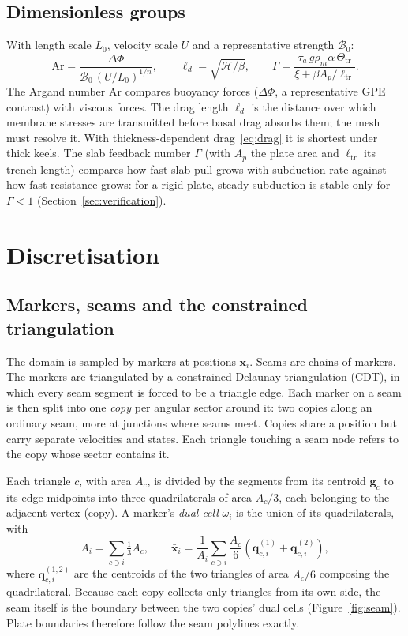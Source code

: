 \documentclass[11pt]{article}
\newcommand{\vect}[1]{\mathbf{#1}}
\newcommand{\Hint}{\mathcal{H}}
\newcommand{\Bint}{\mathcal{B}}
\begin{document}
\subsection{Dimensionless groups}
With length scale $L_0$, velocity scale $U$ and a representative strength $\Bint_0$:
\begin{equation}
  \mathrm{Ar} = \frac{\Delta\Phi}{\Bint_0\,(U/L_0)^{1/n}},
  \qquad
  \ell_d = \sqrt{\Hint/\beta},
  \qquad
  \Gamma = \frac{\tau_a\,g\rho_m\alpha\,\Theta_{\mathrm{tr}}}{\xi + \beta A_p/\ell_{\mathrm{tr}}}.
\end{equation}
The Argand number $\mathrm{Ar}$ compares buoyancy forces ($\Delta\Phi$, a representative GPE contrast) with viscous forces. The drag length $\ell_d$ is the distance over which membrane stresses are transmitted before basal drag absorbs them; the mesh must resolve it. With thickness-dependent drag~\eqref{eq:drag} it is shortest under thick keels. The slab feedback number $\Gamma$ (with $A_p$ the plate area and $\ell_{\mathrm{tr}}$ its trench length) compares how fast slab pull grows with subduction rate against how fast resistance grows: for a rigid plate, steady subduction is stable only for $\Gamma<1$ (Section~\ref{sec:verification}).

\section{Discretisation}

\subsection{Markers, seams and the constrained triangulation}
The domain is sampled by markers at positions $\vect{x}_i$. Seams are chains of markers. The markers are triangulated by a constrained Delaunay triangulation (CDT), in which every seam segment is forced to be a triangle edge. Each marker on a seam is then split into one \emph{copy} per angular sector around it: two copies along an ordinary seam, more at junctions where seams meet. Copies share a position but carry separate velocities and states. Each triangle touching a seam node refers to the copy whose sector contains it.

Each triangle $c$, with area $A_c$, is divided by the segments from its centroid $\vect{g}_c$ to its edge midpoints into three quadrilaterals of area $A_c/3$, each belonging to the adjacent vertex (copy). A marker's \emph{dual cell} $\omega_i$ is the union of its quadrilaterals, with
\begin{equation}
  A_i = \sum_{c\ni i}\tfrac13 A_c,
  \qquad
  \bar{\vect{x}}_i = \frac{1}{A_i}\sum_{c\ni i}\frac{A_c}{6}\left(\vect{q}^{(1)}_{c,i}+\vect{q}^{(2)}_{c,i}\right),
\end{equation}
where $\vect{q}^{(1,2)}_{c,i}$ are the centroids of the two triangles of area $A_c/6$ composing the quadrilateral. Because each copy collects only triangles from its own side, the seam itself is the boundary between the two copies' dual cells (Figure~\ref{fig:seam}). Plate boundaries therefore follow the seam polylines exactly.
\end{document}
